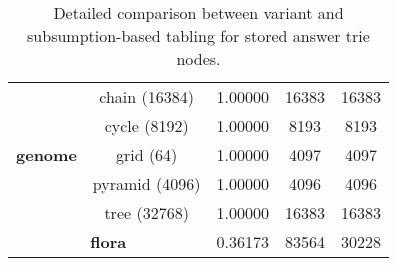 \begin{table}[ht]
{\begin{tabular}{cc|c|cc}
\multirow{5}{*}{\textbf{genome}} &  chain (16384) &  1.00000 &  16383 & 16383
\\
&  cycle (8192) &  1.00000 &  8193 & 8193
\\
&  grid (64) &  1.00000 &  4097 & 4097
\\
&  pyramid (4096) &  1.00000 &  4096 & 4096
\\
&  tree (32768) &  1.00000 &  16383 & 16383
\\
\hline


\multicolumn{2}{c|}{\textbf{flora}} & 0.36173 & 83564 & 30228 \\
\hline
\hline
\end{tabular}
}
\caption{Detailed comparison between variant and subsumption-based tabling for stored answer trie nodes.}
\label{tbl:results_detail_space_sub}
\end{table}
